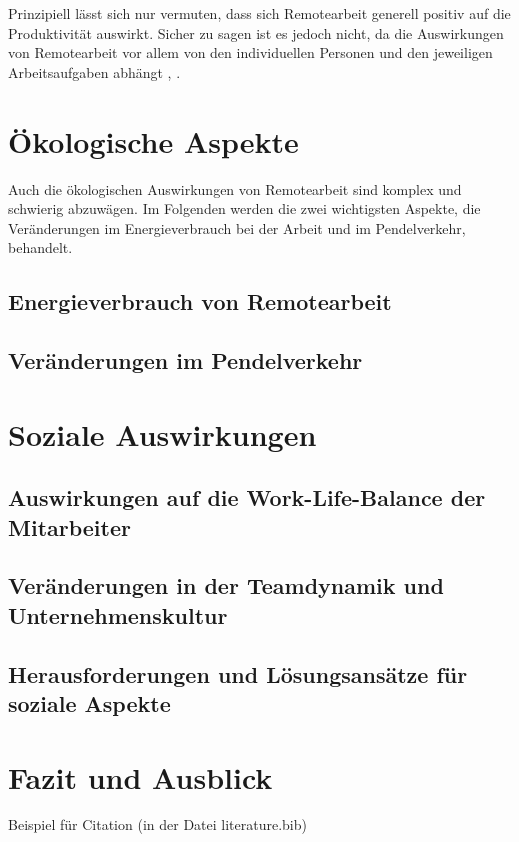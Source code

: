 \documentclass[runningheads]{llncs}
\begin{document}
Prinzipiell lässt sich nur vermuten, dass sich Remotearbeit generell positiv auf die Produktivität auswirkt.
Sicher zu sagen ist es jedoch nicht, da die Auswirkungen von Remotearbeit vor allem von den individuellen Personen und den jeweiligen Arbeitsaufgaben abhängt \cite{glenn_dutcher_effects_2012}, \cite{holand_homeoffice_2023}.

\section{Ökologische Aspekte}

Auch die ökologischen Auswirkungen von Remotearbeit sind komplex und schwierig abzuwägen.
Im Folgenden werden die zwei wichtigsten Aspekte, die Ver\-änderungen im Energieverbrauch bei der Arbeit und im Pendelverkehr, behandelt.

\subsection{Energieverbrauch von Remotearbeit}

\subsection{Veränderungen im Pendelverkehr}


\section{Soziale Auswirkungen}

\subsection{Auswirkungen auf die Work-Life-Balance der Mitarbeiter}

\subsection{Veränderungen in der Teamdynamik und Unternehmenskultur}

\subsection{Herausforderungen und Lösungsansätze für soziale Aspekte}


\section{Fazit und Ausblick}

Beispiel für Citation\cite{noauthor_internet-konferenz_2021}
(in der Datei literature.bib)




\end{document}
